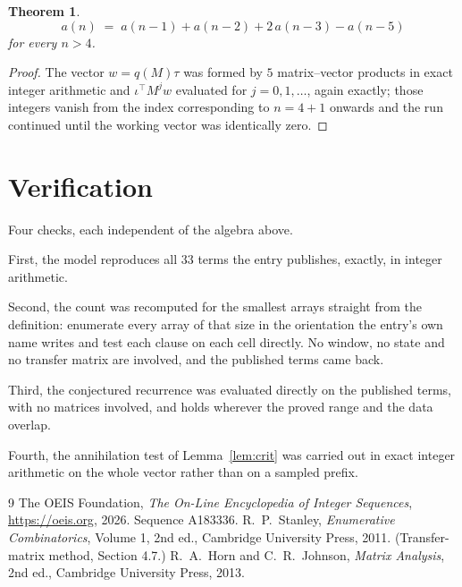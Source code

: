 \documentclass[11pt,a4paper]{article}
\theoremstyle{plain}
\newtheorem{theorem}{Theorem}
\theoremstyle{definition}
\begin{document}
\begin{theorem}
\[
a(n)\;=\;a(n-1) + a(n-2) + 2\,a(n-3) - a(n-5)
\]
for every $n>4$.
\end{theorem}

\begin{proof}
The vector $w=q(M)\tau$ was formed by $5$ matrix--vector products in exact integer
arithmetic and $\iota^{\!\top}M^{j}w$ evaluated for $j=0,1,\dots$, again exactly; those
integers vanish from the index corresponding to $n=4+1$ onwards and the run continued
until the working vector was identically zero.
\end{proof}

\section{Verification}

Four checks, each independent of the algebra above.

First, the model reproduces all $33$ terms the entry publishes, exactly, in integer
arithmetic.

Second, the count was recomputed for the smallest arrays straight from the definition:
enumerate every array of that size in the orientation the entry's own name writes and test each
clause on each cell directly. No window, no state and no transfer matrix are involved, and the
published terms came back.

Third, the conjectured recurrence was evaluated directly on the published terms, with no
matrices involved, and holds wherever the proved range and the data overlap.

Fourth, the annihilation test of Lemma~\ref{lem:crit} was carried out in exact integer
arithmetic on the whole vector rather than on a sampled prefix.

\begin{thebibliography}{9}
 The OEIS Foundation, \emph{The On-Line Encyclopedia of Integer
Sequences}, \url{https://oeis.org}, 2026. Sequence A183336.
 R.~P.~Stanley, \emph{Enumerative Combinatorics}, Volume 1, 2nd ed.,
Cambridge University Press, 2011. (Transfer-matrix method, Section 4.7.)
 R.~A.~Horn and C.~R.~Johnson, \emph{Matrix Analysis}, 2nd ed., Cambridge
University Press, 2013.
\end{thebibliography}
\end{document}
